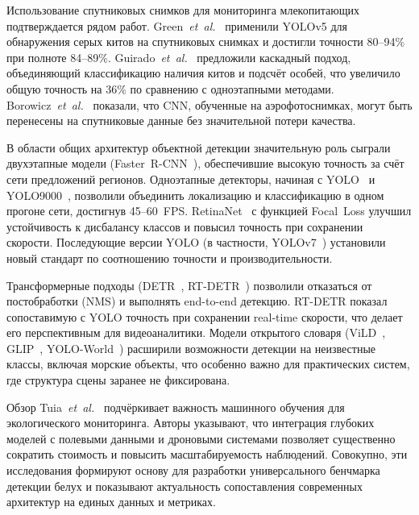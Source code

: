 \documentclass{article}
\begin{document}
Использование спутниковых снимков для мониторинга млекопитающих подтверждается рядом работ.
Green~\textit{et~al.}~\cite{green2023gray} применили YOLOv5 для обнаружения серых китов на спутниковых снимках и достигли точности 80–94\% при полноте 84–89\%.
Guirado~\textit{et~al.}~\cite{guirado2019whale_count} предложили каскадный подход, объединяющий классификацию наличия китов и подсчёт особей, что увеличило общую точность на 36\% по сравнению с одноэтапными методами.
Borowicz~\textit{et~al.}~\cite{borowicz2019aerial} показали, что CNN, обученные на аэрофотоснимках, могут быть перенесены на спутниковые данные без значительной потери качества.

В области общих архитектур объектной детекции значительную роль сыграли двухэтапные модели (Faster~R-CNN~\cite{ren2015fasterrcnn}), обеспечившие высокую точность за счёт сети предложений регионов.
Одноэтапные детекторы, начиная с YOLO~\cite{redmon2016yolo} и YOLO9000~\cite{redmon2017yolo9000}, позволили объединить локализацию и классификацию в одном прогоне сети, достигнув 45–60~FPS.
RetinaNet~\cite{lin2017focal} с функцией Focal~Loss улучшил устойчивость к дисбалансу классов и повысил точность при сохранении скорости.
Последующие версии YOLO (в частности, YOLOv7~\cite{wang2022yolov7}) установили новый стандарт по соотношению точности и производительности.

Трансформерные подходы (DETR~\cite{carion2020end}, RT-DETR~\cite{zhao2023rtdetr}) позволили отказаться от постобработки (NMS) и выполнять end-to-end детекцию. RT-DETR показал сопоставимую с YOLO точность при сохранении real-time скорости, что делает его перспективным для видеоаналитики.
Модели открытого словаря (ViLD~\cite{gu2021vild}, GLIP~\cite{li2022glip}, YOLO-World~\cite{cheng2024yoloworld}) расширили возможности детекции на неизвестные классы, включая морские объекты, что особенно важно для практических систем, где структура сцены заранее не фиксирована.

Обзор Tuia~\textit{et~al.}~\cite{tuia2022wildlife} подчёркивает важность машинного обучения для экологического мониторинга. Авторы указывают, что интеграция глубоких моделей с полевыми данными и дроновыми системами позволяет существенно сократить стоимость и повысить масштабируемость наблюдений.
Совокупно, эти исследования формируют основу для разработки универсального бенчмарка детекции белух и показывают актуальность сопоставления современных архитектур на единых данных и метриках.


\end{document}

